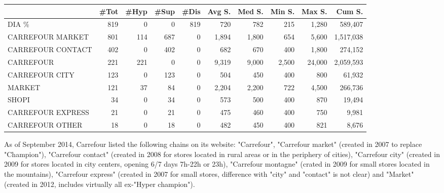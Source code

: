 \documentclass[11pt]{article}
\begin{document}
\begin{table}[H]
\footnotesize
\setlength{\tabcolsep}{2pt}

\begin{tabular}{lrrrrrrrrr}
\toprule
{} &       \#Tot &       \#Hyp &       \#Sup &       \#Dis &     Avg S. &     Med S. &     Min S. &     Max S. &     Cum S. \\
\midrule
DIA \%             &        819 &          0 &          0 &        819 &        720 &        782 &        215 &      1,280 &    589,407 \\
CARREFOUR MARKET  &        801 &        114 &        687 &          0 &      1,894 &      1,800 &        654 &      5,600 &  1,517,038 \\
CARREFOUR CONTACT &        402 &          0 &        402 &          0 &        682 &        670 &        400 &      1,800 &    274,152 \\
CARREFOUR         &        221 &        221 &          0 &          0 &      9,319 &      9,000 &      2,500 &     24,000 &  2,059,593 \\
CARREFOUR CITY    &        123 &          0 &        123 &          0 &        504 &        450 &        400 &        800 &     61,932 \\
MARKET            &        121 &         37 &         84 &          0 &      2,204 &      2,200 &        722 &      4,500 &    266,736 \\
SHOPI             &         34 &          0 &         34 &          0 &        573 &        500 &        400 &        870 &     19,494 \\
CARREFOUR EXPRESS &         21 &          0 &         21 &          0 &        475 &        460 &        400 &        750 &      9,981 \\
CARREFOUR OTHER   &         18 &          0 &         18 &          0 &        482 &        450 &        400 &        821 &      8,676 \\
\bottomrule
\end{tabular}

\end{table}

As of September 2014, Carrefour listed the following chains on its website: "Carrefour", "Carrefour market" (created in 2007 to replace "Champion"), "Carrefour contact" (created in 2008 for stores located in rural areas or in the periphery of cities), "Carrefour city" (created in 2009 for stores located in city centers, opening 6/7 days 7h-22h or 23h), "Carrefour montagne" (crated in 2009 for small stores located in the mountains), "Carrefour express" (created in 2007 for small stores, difference with "city" and "contact" is not clear) and "Market" (created in 2012, includes virtually all ex-"Hyper champion").
\end{document}
